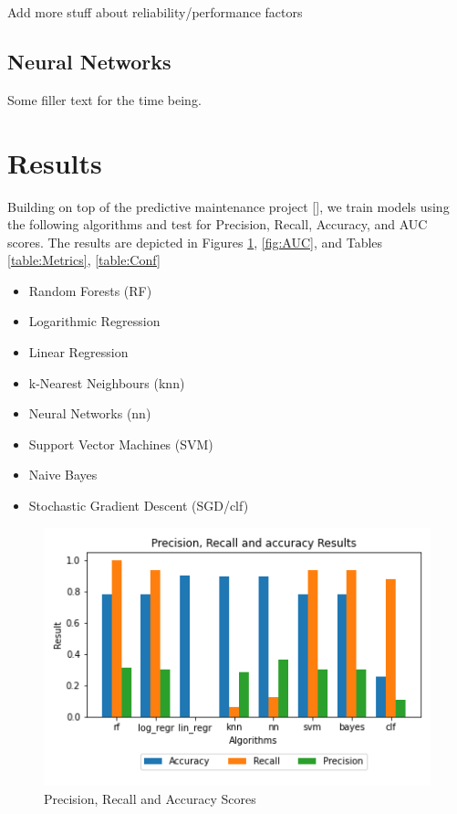 \documentclass[a4paper,12pt]{report}
\begin{document}
Add more stuff about reliability/performance factors


\subsection{Neural Networks}
Some filler text for the time being.

\section{Results}
Building on top of the predictive maintenance project [], we train models using the following algorithms and test for Precision, Recall, Accuracy, and AUC scores.
The results are depicted in Figures \ref{fig:Metric plot}, \ref{fig:AUC}, and Tables \ref{table:Metrics}, \ref{table:Conf}
\begin{itemize}
    \item Random Forests (RF)
    \item Logarithmic Regression
    \item Linear Regression
    \item k-Nearest Neighbours (knn)
    \item Neural Networks (nn)
    \item Support Vector Machines (SVM)
    \item Naive Bayes
    \item Stochastic Gradient Descent (SGD/clf)
\end{itemize}

\begin{figure}[H]
    \includegraphics[scale=0.9]{results.png}
    \centering
    \caption{Precision, Recall and Accuracy Scores}
    \label{fig:Metric plot}
\end{figure}
\end{document}
